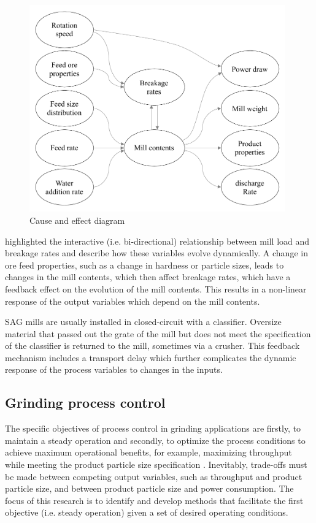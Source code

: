 \begin{figure}[htp]
	\centering
	\includegraphics[width=11cm]{images/cause-effect.pdf}
	\caption{Cause and effect diagram} \label{fig:cause-effect}
\end{figure}

\cite{powell_applying_2009} highlighted the interactive (i.e. bi-directional) relationship between mill load and breakage rates and describe how these variables evolve dynamically. A change in ore feed properties, such as a change in hardness or particle sizes, leads to changes in the mill contents, which then affect breakage rates, which have a feedback effect on the evolution of the mill contents. This results in a non-linear response of the output variables which depend on the mill contents.

SAG mills are usually installed in closed-circuit with a classifier. Oversize material that passed out the grate of the mill but does not meet the specification of the classifier is returned to the mill, sometimes via a crusher. This feedback mechanism includes a transport delay which further complicates the dynamic response of the process variables to changes in the inputs.

\subsection*{Grinding process control}

The specific objectives of process control in grinding applications are firstly, to maintain a steady operation and secondly, to optimize the process conditions to achieve maximum operational benefits, for example, maximizing throughput while meeting the product particle size specification \citep{wei_grinding_2009}. Inevitably, trade-offs must be made between competing output variables, such as throughput and product particle size, and between product particle size and power consumption. The focus of this research is to identify and develop methods that facilitate the first objective (i.e. steady operation) given a set of desired operating conditions.

